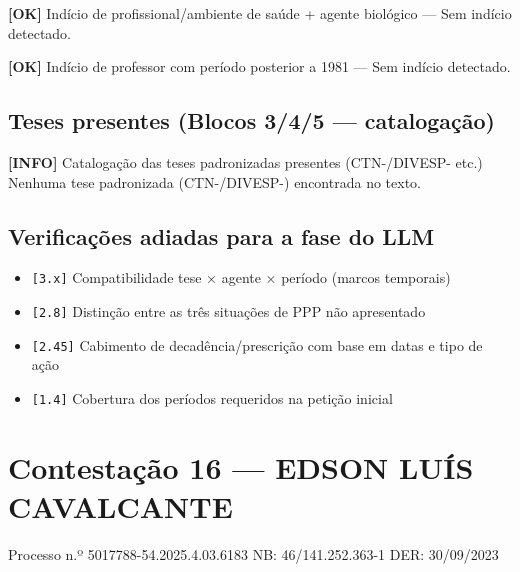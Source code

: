 \documentclass[12pt,a4paper]{article}
\newcommand{\statusOK}[1]{\textcolor{corOK}{\textbf{[OK]}} #1}
\newcommand{\statusINFO}[1]{\textcolor{corINFO}{\textbf{[INFO]}} #1}
\begin{document}
\medskip
\statusOK{Indício de profissional/ambiente de saúde + agente biológico} --- Sem indício detectado.

\medskip
\statusOK{Indício de professor com período posterior a 1981} --- Sem indício detectado.

\subsection{Teses presentes (Blocos 3/4/5 --- catalogação)}

\statusINFO{Catalogação das teses padronizadas presentes (CTN-/DIVESP- etc.)}\\
Nenhuma tese padronizada (CTN-/DIVESP-) encontrada no texto.

\subsection{Verificações adiadas para a fase do LLM}

\begin{itemize}
  \item \texttt{[3.x]} Compatibilidade tese × agente × período (marcos temporais)
  \item \texttt{[2.8]} Distinção entre as três situações de PPP não apresentado
  \item \texttt{[2.45]} Cabimento de decadência/prescrição com base em datas e tipo de ação
  \item \texttt{[1.4]} Cobertura dos períodos requeridos na petição inicial
\end{itemize}



\clearpage
{}
\section{Contestação 16 --- EDSON LUÍS CAVALCANTE}
\begin{center}
  {\small Processo n.º 5017788-54.2025.4.03.6183 \quad NB: 46/141.252.363-1 \quad DER: 30/09/2023}
\end{center}
\end{document}
